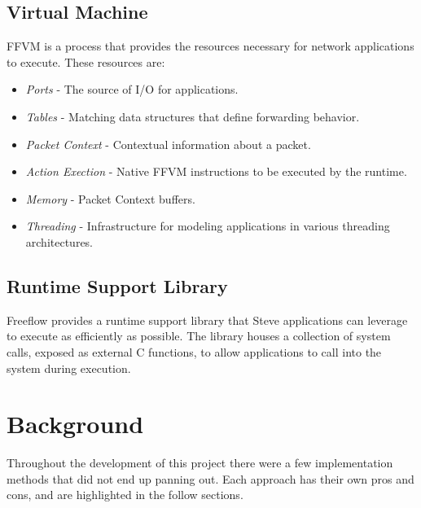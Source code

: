 \subsection{Virtual Machine}
FFVM is a process that provides the resources necessary for network
applications to execute. These resources are:

\begin{itemize}
\item \emph{Ports} - The source of I/O for applications.
\item \emph{Tables} - Matching data structures that define forwarding behavior.
\item \emph{Packet Context} - Contextual information about a packet.
\item \emph{Action Exection} - Native FFVM instructions to be executed by the
runtime.
\item \emph{Memory} - Packet Context buffers.
\item \emph{Threading} - Infrastructure for modeling applications in various
threading architectures.
\end{itemize}

\subsection{Runtime Support Library}
Freeflow provides a runtime support library that Steve applications can 
leverage to execute as efficiently as possible. The library houses a collection
of system calls, exposed as external C functions, to allow applications to call
into the system during execution.

\section{Background}
Throughout the development of this project there were a few implementation
methods that did not end up panning out. Each approach has their own pros
and cons, and are highlighted in the follow sections.

